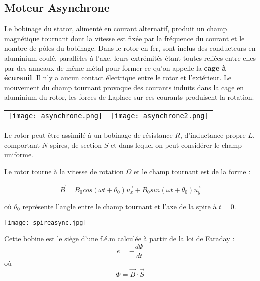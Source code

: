 \documentclass[12pt,prb,aps,epsf]{article}
\begin{document}
\subsection{Moteur Asynchrone}

Le bobinage du stator, alimenté en courant alternatif, produit un champ magnétique tournant dont la vitesse est fixée par la fréquence du courant et le nombre de pôles du bobinage. Dans le rotor en fer, sont inclus des conducteurs en aluminium coulé, parallèles à l’axe, leurs extrémités étant toutes reliées entre elles par des anneaux de même métal pour former ce qu’on appelle la \textbf{cage à écureuil}. Il n’y a aucun contact électrique entre le rotor et l’extérieur. Le mouvement du champ tournant provoque des courants induits dans la cage en aluminium du rotor, les forces de Laplace sur ces courants produisent la rotation.\medskip

\begin{tabular}{cc}
   \texttt{[image: asynchrone.png]} &
   \texttt{[image: asynchrone2.png]} \\
\end{tabular}


\medskip

Le rotor peut être assimilé à un bobinage de résistance $R$, d'inductance propre $L$, comportant $N$ spires, de section $S$ et dans lequel on peut considérer le champ uniforme.\medskip

Le rotor tourne à la vitesse de rotation $\Omega$ et le champ tournant est de la forme :

\begin{equation}
    \vec{B} = B_0 cos(\omega t + \theta_0) \vec{u_x} + B_0 sin(\omega t + \theta_0 ) \vec{u_y}
\end{equation}

où $\theta_0$ représente l'angle entre le champ tournant et l'axe de la spire à $t=0$.

\begin{center}
    \texttt{[image: spireasync.jpg]}
\end{center}

Cette bobine est le siège d'une f.é.m calculée à partir de la loi de Faraday :
\begin{equation}
    e =- \frac{d\Phi}{dt} 
\end{equation}
où 
\begin{equation}
    \Phi = \vec{B} \cdot \vec{S}
\end{equation}
\end{document}
